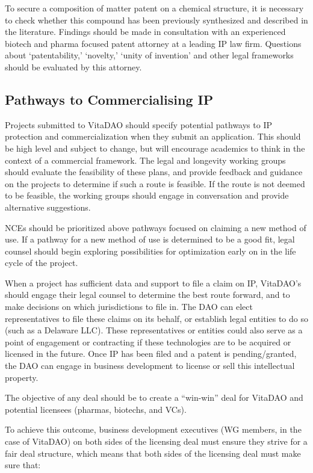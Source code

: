 \documentclass[10pt,letterpaper]{article}
\begin{document}
To secure a composition of matter patent on a chemical structure, it is necessary to check whether this compound has been previously synthesized and described in the literature. Findings should be made in consultation with an experienced biotech and pharma focused patent attorney at a leading IP law firm. Questions about ‘patentability,’ ‘novelty,’ ‘unity of invention’ and other legal frameworks should be evaluated by this attorney.

\subsection{Pathways to Commercialising IP}
Projects submitted to VitaDAO should specify potential pathways to IP protection and commercialization when they submit an application. This should be high level and subject to change, but will encourage academics to think in the context of a commercial framework. The legal and longevity working groups should evaluate the feasibility of these plans, and provide feedback and guidance on the projects to determine if such a route is feasible. If the route is not deemed to be feasible, the working groups should engage in conversation and provide alternative suggestions. 

NCEs should be prioritized above pathways focused on claiming a new method of use. If a pathway for a new method of use is determined to be a good fit, legal counsel should begin exploring possibilities for optimization early on in the life cycle of the project. 

When a project has sufficient data and support to file a claim on IP, VitaDAO’s should engage their legal counsel to determine the best route forward, and to make decisions on which jurisdictions to file in. The DAO can elect representatives to file these claims on its behalf, or establish legal entities to do so (such as a Delaware LLC). These representatives or entities could also serve as a point of engagement or contracting if these technologies are to be acquired or licensed in the future. Once IP has been filed and a patent is pending/granted, the DAO can engage in business development to license or sell this intellectual property.

The objective of any deal should be to create a “win-win” deal for VitaDAO and potential licensees (pharmas, biotechs, and VCs).

To achieve this outcome, business development executives (WG members, in the case of VitaDAO) on both sides of the licensing deal must ensure they strive for a fair deal structure, which means that both sides of the licensing deal must make sure that:
\end{document}
